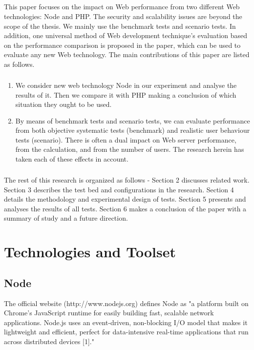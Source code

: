 \documentclass[a4paper, onecolumn, oneside, 11pt, wide, floatssmall]{mwrep}
\begin{document}
\paragraph{}
This paper focuses on the impact on Web performance from two different Web technologies: Node and PHP. The security and scalability issues are beyond the scope of the thesis. We mainly use the benchmark tests and scenario tests. In addition, one universal method of Web development technique’s evaluation based on the performance comparison is proposed in the paper, which can be used to evaluate any new Web technology. The main contributions of this paper are listed as follows. 
\paragraph{}
\begin{enumerate}
    \item We consider new web technology Node in our experiment and analyse the results of it. Then we compare it with PHP making a conclusion of which situation they ought to be used. 
    \item By means of benchmark tests and scenario tests, we can evaluate performance from both objective systematic tests (benchmark) and realistic user behaviour tests (scenario). There is often a dual impact on Web server performance, from the calculation, and from the number of users. The research herein has taken each of these effects in account.
\end{enumerate} 
\paragraph{}

The rest of this research is organized as follows - Section 2 discusses related work. Section 3 describes the test bed and configurations in the research. Section 4 details the methodology and experimental design of tests. Section 5 presents and analyses the results of all tests. Section 6 makes a conclusion of the paper with a summary of study and a future direction.

\chapter{Technologies and Toolset}

\section{Node}
The official website (http://www.nodejs.org) defines Node as "a platform built on Chrome's JavaScript runtime for easily building fast, scalable network applications. Node.js uses an event-driven, non-blocking I/O model that makes it lightweight and efficient, perfect for data-intensive real-time applications that run across distributed devices [1]."
\end{document}
